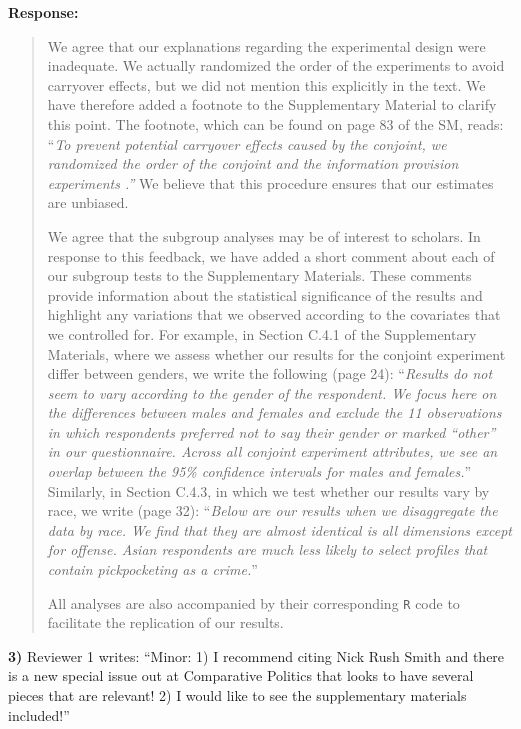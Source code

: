 \documentclass[a4paper,12pt]{article}
\begin{document}
\noindent \textbf{Response:} 
\begin{quote}

We agree that our explanations regarding the experimental design were
inadequate. We actually randomized the order of the experiments to avoid
carryover effects, but we did not mention this explicitly in the text. We have
therefore added a footnote to the Supplementary Material to clarify this point.
The footnote, which can be found on page 83 of the SM, reads: ``\textit{To
prevent potential carryover effects caused by the conjoint, we randomized the
order of the conjoint and the information provision experiments
\citep{perreault1975controlling}.''} We believe that this procedure ensures
that our estimates are unbiased.

We agree that the subgroup analyses may be of interest to scholars. In response
to this feedback, we have added a short comment about each of our subgroup
tests to the Supplementary Materials. These comments provide information about
the statistical significance of the results and highlight any variations that
we observed according to the covariates that we controlled for. For example, in
Section C.4.1 of the Supplementary Materials, where we assess whether our
results for the conjoint experiment differ between genders, we write the
following (page 24): ``\textit{Results do not seem to vary according to the
  gender of the respondent. We focus here on the differences between males and
  females and exclude the 11 observations in which respondents preferred not to
say their gender or marked ``other'' in our questionnaire. Across all conjoint
experiment attributes, we see an overlap between the 95\% confidence intervals
for males and females.}'' Similarly, in Section C.4.3, in which we test whether
our results vary by race, we write (page 32): ``\textit{Below are our results
  when we disaggregate the data by race. We find that they are almost identical
  is all dimensions except for offense. Asian respondents are much less likely
to select profiles that contain pickpocketing as a crime.}''  

All analyses are also accompanied by their corresponding \texttt{R} code to
facilitate the replication of our results. 

\end{quote}

\vspace{.3cm}

\noindent \textbf{3)} Reviewer 1 writes: ``Minor: 1) I recommend citing Nick
Rush Smith and there is a new special issue out at Comparative Politics that
looks to have several pieces that are relevant! 2) I would like to see the
supplementary materials included!''
\end{document}

